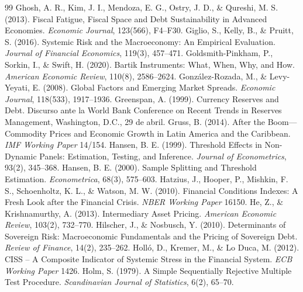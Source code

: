 \begin{thebibliography}{99}
 Ghosh, A. R., Kim, J. I., Mendoza, E. G., Ostry, J. D., \& Qureshi, M. S. (2013). Fiscal Fatigue, Fiscal Space and Debt Sustainability in Advanced Economies. \textit{Economic Journal}, 123(566), F4--F30.
 Giglio, S., Kelly, B., \& Pruitt, S. (2016). Systemic Risk and the Macroeconomy: An Empirical Evaluation. \textit{Journal of Financial Economics}, 119(3), 457--471.
 Goldsmith-Pinkham, P., Sorkin, I., \& Swift, H. (2020). Bartik Instruments: What, When, Why, and How. \textit{American Economic Review}, 110(8), 2586--2624.
 González-Rozada, M., \& Levy-Yeyati, E. (2008). Global Factors and Emerging Market Spreads. \textit{Economic Journal}, 118(533), 1917--1936.
 Greenspan, A. (1999). Currency Reserves and Debt. Discurso ante la World Bank Conference on Recent Trends in Reserves Management, Washington, D.C., 29 de abril.
 Gruss, B. (2014). After the Boom---Commodity Prices and Economic Growth in Latin America and the Caribbean. \textit{IMF Working Paper} 14/154.
 Hansen, B. E. (1999). Threshold Effects in Non-Dynamic Panels: Estimation, Testing, and Inference. \textit{Journal of Econometrics}, 93(2), 345--368.
 Hansen, B. E. (2000). Sample Splitting and Threshold Estimation. \textit{Econometrica}, 68(3), 575--603.
 Hatzius, J., Hooper, P., Mishkin, F. S., Schoenholtz, K. L., \& Watson, M. W. (2010). Financial Conditions Indexes: A Fresh Look after the Financial Crisis. \textit{NBER Working Paper} 16150.
 He, Z., \& Krishnamurthy, A. (2013). Intermediary Asset Pricing. \textit{American Economic Review}, 103(2), 732--770.
 Hilscher, J., \& Nosbusch, Y. (2010). Determinants of Sovereign Risk: Macroeconomic Fundamentals and the Pricing of Sovereign Debt. \textit{Review of Finance}, 14(2), 235--262.
 Holló, D., Kremer, M., \& Lo Duca, M. (2012). CISS -- A Composite Indicator of Systemic Stress in the Financial System. \textit{ECB Working Paper} 1426.
 Holm, S. (1979). A Simple Sequentially Rejective Multiple Test Procedure. \textit{Scandinavian Journal of Statistics}, 6(2), 65--70.

\end{thebibliography}
